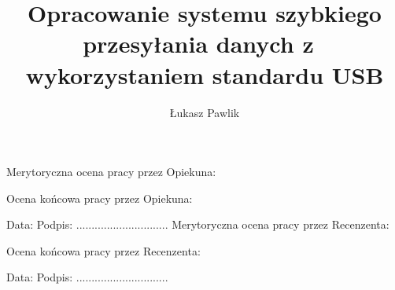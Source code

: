 \documentclass{BscUS}
\title{Opracowanie systemu szybkiego przesyłania danych z~ wykorzystaniem standardu USB}
\author{Łukasz Pawlik}
\newcommand\blankpage{%
    \null
    \thispagestyle{empty}%
    \newpage}
\begin{document}
\pagestyle{plain}

\maketitle

\makestatement

\newpage
\thispagestyle{plain}
Merytoryczna ocena pracy przez Opiekuna:


Ocena końcowa pracy przez Opiekuna: 

\hspace{2cm} Data: \hspace{6cm}  Podpis: ..............................
\afterpage{\blankpage}
\newpage
\thispagestyle{plain}
Merytoryczna ocena pracy przez Recenzenta:


Ocena końcowa pracy przez Recenzenta: 

\hspace{2cm} Data: \hspace{6cm}  Podpis: ..............................
\pagebreak
\newpage
\thispagestyle{plain}
\renewcommand*{\lstlistlistingname }{Spis elementów implementacji}

\clearpage
\tableofcontents
\afterpage{\blankpage}
\lstlistoflistings
\afterpage{\blankpage}


\end{document}
